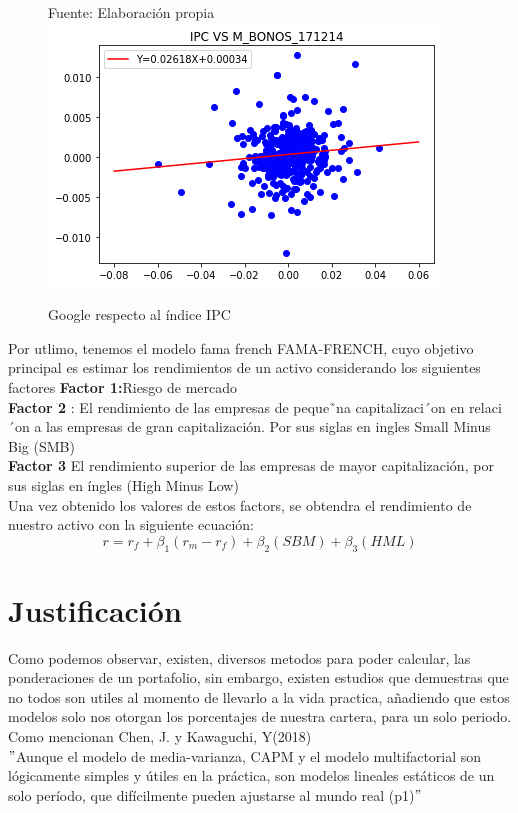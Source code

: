 \documentclass[12pt,a4paper]{article}
\begin{document}
	\hfill\break
	\begin{figure}
		\centering
		\caption{Google respecto al índice IPC}{{\footnotesize Fuente: Elaboración propia}}
		\includegraphics[scale=0.6]{ejmplo_CAPM.png}
	\end{figure}
	\hfill\break
    Por utlimo, tenemos el  modelo fama french FAMA-FRENCH, cuyo objetivo principal es estimar los rendimientos de un activo considerando los siguientes factores
     \textbf{Factor 1:}Riesgo de mercado\\
    \textbf{Factor 2 }: El rendimiento de las empresas de peque˜na capitalizaci´on en relaci´on a las empresas de gran capitalización. Por sus siglas en ingles Small Minus Big (SMB)\\
    \textbf{Factor 3 } El rendimiento superior de las empresas de mayor capitalización, por sus siglas en íngles (High Minus Low)\\
    Una vez obtenido los valores de estos factors, se obtendra el rendimiento de nuestro activo
    con la siguiente ecuación:\\
    $$r = r_{f} + \beta_{1}(r_{m} − r_{f} ) + \beta_{2}(SBM) + \beta_{3}(HML)$$
    \newpage
	\section{Justificación}
	\hfill\break
	Como podemos observar, existen, diversos metodos para poder calcular, las ponderaciones de un portafolio, sin embargo, existen estudios que demuestras que no todos son utiles al momento de llevarlo a la vida practica, añadiendo que estos modelos solo nos otorgan   los porcentajes de nuestra cartera, para un solo periodo.\\
	Como mencionan   Chen, J. y Kawaguchi, Y(2018)\\
	\hfill\break
	$"$Aunque el modelo de media-varianza, CAPM y el modelo multifactorial son lógicamente simples y útiles en la práctica, son modelos lineales estáticos de un solo período, que difícilmente pueden ajustarse al mundo real (p1)$"$\\
	\hfill\break
	
\end{document}
